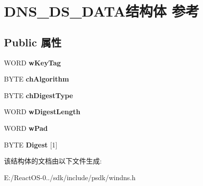 \hypertarget{struct_d_n_s___d_s___d_a_t_a}{}\section{D\+N\+S\+\_\+\+D\+S\+\_\+\+D\+A\+T\+A结构体 参考}
\label{struct_d_n_s___d_s___d_a_t_a}
\subsection*{Public 属性}
\begin{DoxyCompactItemize}
\item 
\mbox{\label{struct_d_n_s___d_s___d_a_t_a_a2ffa6669b56721a5681737cd87f02acd}} 
W\+O\+RD {\bfseries w\+Key\+Tag}
\item 
\mbox{\label{struct_d_n_s___d_s___d_a_t_a_a12f183d30d30ab36d297bd7095d3521a}} 
B\+Y\+TE {\bfseries ch\+Algorithm}
\item 
\mbox{\label{struct_d_n_s___d_s___d_a_t_a_a43807209180d86723ecb70d80917c54c}} 
B\+Y\+TE {\bfseries ch\+Digest\+Type}
\item 
\mbox{\label{struct_d_n_s___d_s___d_a_t_a_a5655a19e880ab1bffd2ac5b35d1be0c5}} 
W\+O\+RD {\bfseries w\+Digest\+Length}
\item 
\mbox{\label{struct_d_n_s___d_s___d_a_t_a_a1dc10c2422497ce204a8d963ebaf5d71}} 
W\+O\+RD {\bfseries w\+Pad}
\item 
\mbox{\label{struct_d_n_s___d_s___d_a_t_a_adb5fbbbedc85a820944bee94ce792261}} 
B\+Y\+TE {\bfseries Digest} \mbox{[}1\mbox{]}
\end{DoxyCompactItemize}


该结构体的文档由以下文件生成\+:\begin{DoxyCompactItemize}
\item 
E\+:/\+React\+O\+S-\/0../sdk/include/psdk/windns.\+h\end{DoxyCompactItemize}
